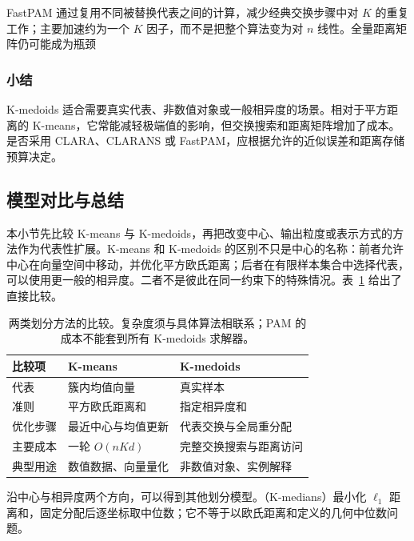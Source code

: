 FastPAM 通过复用不同被替换代表之间的计算，减少经典交换步骤中对 $K$ 的重复工作；主要加速约为一个 $K$ 因子，而不是把整个算法变为对 $n$ 线性。全量距离矩阵仍可能成为瓶颈

\subsubsection{小结}

K-medoids 适合需要真实代表、非数值对象或一般相异度的场景。相对于平方距离的 K-means，它常能减轻极端值的影响，但交换搜索和距离矩阵增加了成本。是否采用 CLARA、CLARANS 或 FastPAM，应根据允许的近似误差和距离存储预算决定。

\subsection{模型对比与总结}

本小节先比较 K-means 与 K-medoids，再把改变中心、输出粒度或表示方式的方法作为代表性扩展。K-means 和 K-medoids 的区别不只是中心的名称：前者允许中心在向量空间中移动，并优化平方欧氏距离；后者在有限样本集合中选择代表，可以使用更一般的相异度。二者不是彼此在同一约束下的特殊情况。表~\ref{tab:clustering-partition} 给出了直接比较。

\begin{table}[htbp]
 \small
 \begin{tabularx}{\linewidth}{@{}l>{\raggedright\arraybackslash}X>{\raggedright\arraybackslash}X@{}}
 \toprule
 比较项 & K-means & K-medoids\\
 \midrule
 代表 & 簇内均值向量 & 真实样本\\
 准则 & 平方欧氏距离和 & 指定相异度和\\
 优化步骤 & 最近中心与均值更新 & 代表交换与全局重分配\\
 主要成本 & 一轮 $O(nKd)$ & 完整交换搜索与距离访问\\
 典型用途 & 数值数据、向量量化 & 非数值对象、实例解释\\
 \bottomrule
 \end{tabularx}
 \caption{两类划分方法的比较。复杂度须与具体算法相联系；PAM 的成本不能套到所有 K-medoids 求解器。}
 \label{tab:clustering-partition}
\end{table}

沿中心与相异度两个方向，可以得到其他划分模型。（K-medians）最小化 $\ell_1$ 距离和，固定分配后逐坐标取中位数；它不等于以欧氏距离和定义的几何中位数问题。

